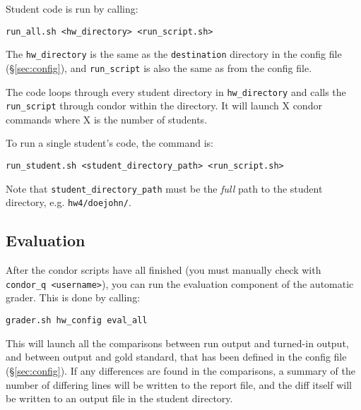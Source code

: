 \documentclass[12pt]{article}
\begin{document}
Student code is run by calling:

\vspace{5pt}

\noindent \texttt{run\_all.sh <hw\_directory> <run\_script.sh>}

\vspace{5pt}

\noindent The \texttt{hw\_directory}  is the same as the \texttt{destination} directory in the config file (\S\ref{sec:config}), and \texttt{run\_script} is also the same as from the config file.

The code loops through every student directory in \texttt{hw\_directory} and calls the \texttt{run\_script} through condor within the directory. It will launch X condor commands where X is the number of students.

To run a single student's code, the command is:

\vspace{5pt}

\noindent \texttt{run\_student.sh <student\_directory\_path> <run\_script.sh>}

\vspace{5pt}

Note that \texttt{student\_directory\_path} must be the \textit{full} path to the student directory, e.g. \texttt{hw4/doejohn/}.

\subsection{Evaluation} \label{sec:secondgrade}

After the condor scripts have all finished (you must manually check with \texttt{condor\_q <username>}), you can run the evaluation component of the automatic grader. This is done by calling:

\vspace{5pt}

\noindent \texttt{grader.sh hw\_config eval\_all}

\vspace{5pt}

This will launch all the comparisons between run output and turned-in output, and between output and gold standard, that has been defined in the config file (\S\ref{sec:config}). If any differences are found in the comparisons, a summary of the number of differing lines will be written to the report file, and the diff itself will be written to an output file in the student directory.
\end{document}
